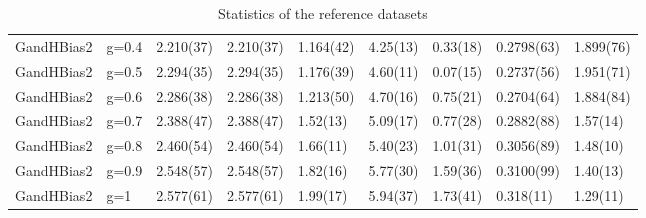 \begin{table}[ht]
\begin{tabular}{lllllllll}
  GandHBias2 & g=0.4 & 2.210(37) & 2.210(37) & 1.164(42) & 4.25(13) & 0.33(18) & 0.2798(63) & 1.899(76) \\ 
  GandHBias2 & g=0.5 & 2.294(35) & 2.294(35) & 1.176(39) & 4.60(11) & 0.07(15) & 0.2737(56) & 1.951(71) \\ 
  GandHBias2 & g=0.6 & 2.286(38) & 2.286(38) & 1.213(50) & 4.70(16) & 0.75(21) & 0.2704(64) & 1.884(84) \\ 
  GandHBias2 & g=0.7 & 2.388(47) & 2.388(47) & 1.52(13) & 5.09(17) & 0.77(28) & 0.2882(88) & 1.57(14) \\ 
  GandHBias2 & g=0.8 & 2.460(54) & 2.460(54) & 1.66(11) & 5.40(23) & 1.01(31) & 0.3056(89) & 1.48(10) \\ 
  GandHBias2 & g=0.9 & 2.548(57) & 2.548(57) & 1.82(16) & 5.77(30) & 1.59(36) & 0.3100(99) & 1.40(13) \\ 
  GandHBias2 & g=1 & 2.577(61) & 2.577(61) & 1.99(17) & 5.94(37) & 1.73(41) & 0.318(11) & 1.29(11) \\ 
   \hline
\end{tabular}
\caption{Statistics of the reference datasets} 
\label{tab:statsRef}
\end{table}

